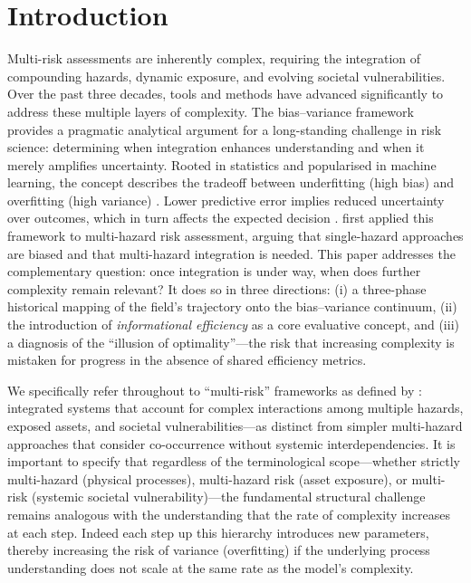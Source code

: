 \documentclass[12pt]{article}
\begin{document}
 \section{Introduction}
Multi-risk assessments are inherently complex, requiring the integration of compounding hazards, dynamic exposure, and evolving societal vulnerabilities. Over the past three decades, tools and methods have advanced significantly to address these multiple layers of complexity. The bias--variance framework \citep{geman1992neural} provides a pragmatic analytical argument for a long-standing challenge in risk science: determining when integration enhances understanding and when it merely amplifies uncertainty. Rooted in statistics and popularised in machine learning, the concept describes the tradeoff between underfitting (high bias) and overfitting (high variance) \citep{geman1992neural, hastie2009elements}. Lower predictive error implies reduced uncertainty over outcomes, which in turn affects the expected decision \citep{domingos2000unified}. \citet{Dunant2021} first applied this framework to multi-hazard risk assessment, arguing that single-hazard approaches are biased and that multi-hazard integration is needed. This paper addresses the complementary question: once integration is under way, when does further complexity remain relevant? It does so in three directions: (i) a three-phase historical mapping of the field's trajectory onto the bias--variance continuum, (ii) the introduction of \textit{informational efficiency} as a core evaluative concept, and (iii) a diagnosis of the ``illusion of optimality''---the risk that increasing complexity is mistaken for progress in the absence of shared efficiency metrics.

We specifically refer throughout to ``multi-risk'' frameworks as defined by \citet{zschau20172}: integrated systems that account for complex interactions among multiple hazards, exposed assets, and societal vulnerabilities---as distinct from simpler multi-hazard approaches that consider co-occurrence without systemic interdependencies. It is important to specify that regardless of the terminological scope---whether strictly multi-hazard (physical processes), multi-hazard risk (asset exposure), or multi-risk (systemic societal vulnerability)---the fundamental structural challenge remains analogous with the understanding that the rate of complexity increases at each step. Indeed each step up this hierarchy introduces new parameters, thereby increasing the risk of variance (overfitting) if the underlying process understanding does not scale at the same rate as the model's complexity.
\end{document}
